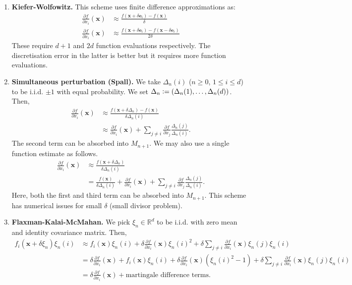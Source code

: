 \begin{enumerate}
    \item \textbf{Kiefer-Wolfowitz.} This scheme uses finite difference approximations as:
    \begin{align*}
        \frac{\partial f}{\partial x_i}(\mathbf{x}) &\approx \frac{f(\mathbf{x} + \delta \mathbf{e}_i) - f(\mathbf{x})}{\delta} \\
        \frac{\partial f}{\partial x_i}(\mathbf{x}) &\approx \frac{f(\mathbf{x} + \delta \mathbf{e}_i) - f(\mathbf{x} - \delta \mathbf{e}_i)}{2\delta}
    \end{align*}
    These require $d+1$ and $2d$ function evaluations respectively. The discretisation error in the latter is better but it requires more function evaluations. 
    
    \item \textbf{Simultaneous perturbation (Spall).} We take $\Delta_n(i)$ ($n \geq 0$, $1 \leq i \leq d$) to be i.i.d. $\pm 1$ with equal probability. We set $\Delta_n \vcentcolon= \left( \Delta_n(1) , \ldots, \Delta_n(d) \right)$. Then, 
    \begin{align*}
        \frac{\partial f}{\partial x_i}(\mathbf{x}) &\approx \frac{f(\mathbf{x} + \delta \Delta_n) - f(\mathbf{x})}{\delta \Delta_n(i)} \\
        &\approx \frac{\partial f}{\partial x_i}(\mathbf{x}) + \sum_{j \neq i} \frac{\partial f}{\partial x_j} \frac{\Delta_n(j)}{\Delta_n(i)}.
    \end{align*}
    The second term can be absorbed into $M_{n+1}$. We may also use a single function estimate as follows.
    \begin{align*}
        \frac{\partial f}{\partial x_i}(\mathbf{x}) &\approx \frac{f(\mathbf{x} + \delta \Delta_n)}{\delta \Delta_n(i)} \\
        &= \frac{f(\mathbf{x})}{\delta \Delta_n(i)} + \frac{\partial f}{\partial x_i}(\mathbf{x}) + \sum_{j \neq i} \frac{\partial f}{\partial x_j} \frac{\Delta_n(j)}{\Delta_n(i)}.
    \end{align*}
    Here, both the first and third term can be absorbed into $M_{n+1}$. This scheme has numerical issues for small $\delta$ (small divisor problem). 
    
    \item \textbf{Flaxman-Kalai-McMahan.} We pick $\xi_n \in \mathbb{R}^d$ to be i.i.d. with zero mean and identity covariance matrix. Then, 
    \begin{align*}
        f_i(\mathbf{x} + \delta \xi_n) \xi_n(i) &\approx f_i(\mathbf{x})\xi_n(i) + \delta \frac{\partial f}{\partial x_i}(\mathbf{x}) \xi_n(i)^2 + \delta \sum_{j \neq i} \frac{\partial f}{\partial x_i}(\mathbf{x}) \xi_n(j) \xi_n(i) \\
        &= \delta \frac{\partial f}{\partial x_i}(\mathbf{x}) + f_i(\mathbf{x})\xi_n(i) + \delta \frac{\partial f}{\partial x_i}(\mathbf{x}) (\xi_n(i)^2-1) + \delta \sum_{j \neq i} \frac{\partial f}{\partial x_i}(\mathbf{x}) \xi_n(j) \xi_n(i) \\
        &= \delta \frac{\partial f}{\partial x_i}(\mathbf{x}) + \text{martingale difference terms}.
    \end{align*}
    

\end{enumerate}
